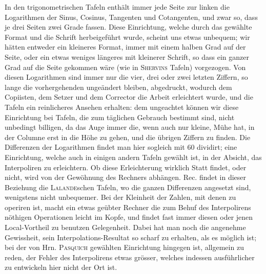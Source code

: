 In den trigonometrischen Tafeln enthält immer jede Seite zur linken die
Logarithmen der Sinus, Cosinus, Tangenten und Cotangenten, und zwar so,
dass je drei Seiten zwei Grade fassen. Diese Einrichtung, welche durch das gewählte Format und die Schrift herbeigeführt wurde, scheint uns etwas unbequem;
wir hätten entweder ein kleineres Format, immer mit einem halben Grad auf der
Seite, oder ein etwas weniges längeres mit kleinerer Schrift, so dass ein ganzer
Grad auf die Seite gekommen wäre (wie in \textsc{Shervins} Tafeln) vorgezogen. Von diesen Logarithmen sind immer nur die vier, drei oder zwei letzten Ziffern, so lange
die vorhergehenden ungeändert bleiben, abgedruckt, wodurch dem Copiisten, dem
Setzer und dem Corrector die Arbeit erleichtert wurde, und die Tafeln ein reinlicheres Ansehen erhalten: dem ungeachtet können wir diese Einrichtung bei
Tafeln, die zum täglichen Gebrauch bestimmt sind, nicht unbedingt billigen, da
das Auge immer die, wenn auch nur kleine, Mühe hat, in der Columne erst in
die Höhe zu gehen, und die übrigen Ziffern zu finden. Die Differenzen der Logarithmen findet man hier sogleich mit 60 dividirt; eine Einrichtung, welche auch
in einigen andern Tafeln gewählt ist, in der Absicht, das Interpoliren zu erleichtern. Ob diese Erleichterung wirklich Statt findet, oder nicht, wird von der Gewöhnung des Rechners abhängen. Rec. findet in dieser Beziehung die \textsc{Lalande}schen Tafeln, wo die ganzen Differenzen angesetzt sind, wenigstens nicht unbequemer. Bei der Kleinheit der Zahlen, mit denen zu operiren ist, macht ein
etwas geübter Rechner die zum Behuf des Interpolirens nöthigen Operationen
leicht im Kopfe, und findet fast immer diesen oder jenen Local-Vortheil zu benutzen Gelegenheit. Dabei hat man noch die angenehme Gewissheit, sein Interpolations-Resultat so scharf zu erhalten, als es möglich ist; bei der von Hrn. \textsc{Pasquich} gewählten Einrichtung hingegen ist, allgemein zu reden, der Fehler des
Interpolirens etwas grösser, welches indessen ausführlicher zu entwickeln hier
nicht der Ort ist.

